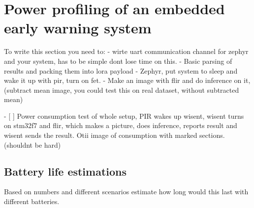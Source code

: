 \section{ Power profiling of an embedded early warning system}

To write this section you need to:
 - wirte uart communication channel for zephyr and your system, has to be simple dont lose time on this.
 - Basic parsing of results and packing them into lora payload
 - Zephyr, put system to sleep and wake it up with pir, turn on fet.
 - Make an image with flir and do inference on it, (subtract mean image, you could test this on real dataset, without subtracted mean)

- [ ] Power consumption test of whole setup, 
      PIR wakes up wisent, 
      wisent turns on stm32f7 and flir, 
      which makes a picture, does inference, reports result and wisent sends the result. 
      Otii image of consumption with marked sections.(shouldnt be hard)

\subsection{ Battery life estimations}
Based on numbers and different scenarios estimate how long would this last with different batteries.
